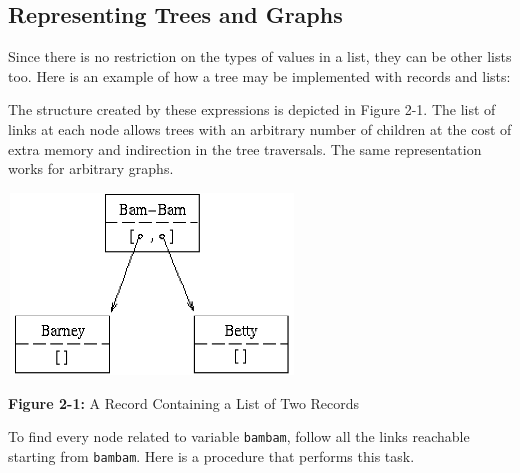 \subsection*{Representing Trees and Graphs}

Since there is no restriction on the types of values in a list, they can
be other lists too. Here is an example of how a tree may be implemented
with records and lists:


The structure created by these expressions is depicted in Figure 2-1.
The list of links at each node allows trees with an arbitrary number of
children at the cost of extra memory and indirection in the tree
traversals. The same representation works for arbitrary
graphs.



\begin{center}
\includegraphics[width=3in,height=1.9in]{ub-img/ub-img6.png}
\end{center}

{\sffamily\bfseries Figure 2-1:}
{\sffamily A Record Containing a List of Two Records}

\bigskip

To find every node related to variable \texttt{bambam}, follow all the
links reachable starting from \texttt{bambam}. Here is a procedure that
performs this task.


